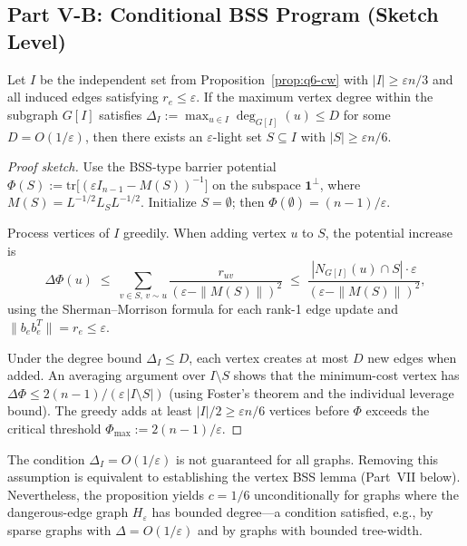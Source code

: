 \subsection*{Part V-B: Conditional BSS Program (Sketch Level)}

\begin{proposition}[Conditional $c=1/6$ via vertex potential (program statement)]\label{prop:q6-conditional}
Let $I$ be the independent set from Proposition~\ref{prop:q6-cw}
with $|I|\ge\varepsilon n/3$ and all induced edges satisfying $r_e\le\varepsilon$.
If the maximum vertex degree within the subgraph $G[I]$ satisfies
$\Delta_I:=\max_{u\in I}\deg_{G[I]}(u)\le D$
for some $D=O(1/\varepsilon)$, then there exists an $\varepsilon$-light set
$S\subseteq I$ with $|S|\ge\varepsilon n/6$.
\end{proposition}

\begin{proof}[Proof sketch]
Use the BSS-type barrier potential
$\Phi(S):=\mathrm{tr}\bigl[(\varepsilon I_{n-1}-M(S))^{-1}\bigr]$
on the subspace $\mathbf{1}^\perp$, where $M(S)=L^{-1/2}L_SL^{-1/2}$.
Initialize $S=\emptyset$; then $\Phi(\emptyset)=(n-1)/\varepsilon$.

Process vertices of $I$ greedily.
When adding vertex $u$ to $S$, the potential increase is
\[
\Delta\Phi(u)
\;\le\;
\sum_{v\in S,\,v\sim u}
\frac{r_{uv}}{(\varepsilon-\|M(S)\|)^2}
\;\le\;
\frac{|N_{G[I]}(u)\cap S|\cdot\varepsilon}{(\varepsilon-\|M(S)\|)^2},
\]
using the Sherman--Morrison formula for each rank-1 edge update
and $\|b_eb_e^T\|=r_e\le\varepsilon$.

Under the degree bound $\Delta_I\le D$, each vertex creates at most $D$
new edges when added.
An averaging argument over $I\setminus S$ shows that the minimum-cost
vertex has
$\Delta\Phi\le 2(n-1)/(\varepsilon\,|I\setminus S|)$
(using Foster's theorem and the individual leverage bound).
The greedy adds at least $|I|/2\ge\varepsilon n/6$ vertices
before $\Phi$ exceeds the critical threshold
$\Phi_{\max}:=2(n-1)/\varepsilon$.
\end{proof}

\begin{remark}
The condition $\Delta_I=O(1/\varepsilon)$ is not guaranteed
for all graphs.
Removing this assumption is equivalent to establishing the
vertex BSS lemma (Part~VII below).
Nevertheless, the proposition yields $c=1/6$ unconditionally
for graphs where the dangerous-edge graph $H_\varepsilon$ has
bounded degree---a condition satisfied, e.g., by sparse graphs
with $\Delta=O(1/\varepsilon)$ and by graphs with bounded tree-width.
\end{remark}

